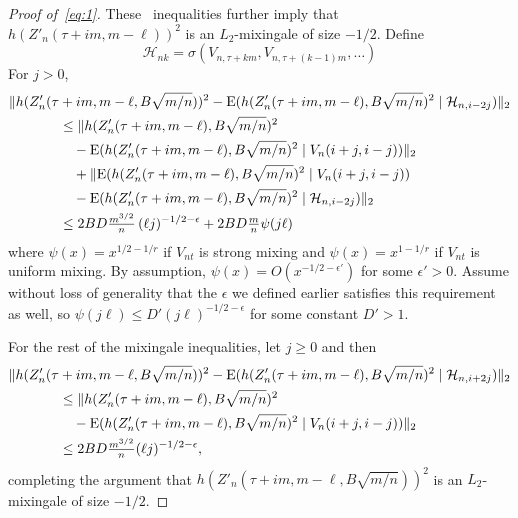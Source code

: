 \documentclass[11pt]{article}
\begin{document}
{\begin{proof}[Proof of~\eqref{eq:1}]
  These \ned\ inequalities further imply that $h(Z'_n(\tau + im, m -
  \ell))^2$ is an $L_2$-mixingale of size $-1/2$. Define
  \begin{equation*}
     \mathcal{H}_{nk} = \sigma(V_{n,\tau + km}, V_{n,\tau + (k-1)m},\dots)
  \end{equation*}
  For $j > 0$,
  \begin{align*}
    \lVert h(Z'_n(\tau &+ im, m - \ell, B \sqrt{m/n}))^2 -
    \operatorname{E}(h(Z'_n(\tau + im, m - \ell), B \sqrt{m/n})^2 \mid
    \mathcal{H}_{n,i - 2j}) \rVert_2 \\
    &\leq 
    \lVert h(Z'_n(\tau + im, m - \ell), B \sqrt{m/n})^2 \\
    &\quad -
    \operatorname{E}(h(Z'_n(\tau + im, m - \ell), B \sqrt{m/n})^2 \mid V_n(i + j, i-j)) \rVert_2 \\
    & \quad
    + \lVert \operatorname{E}(h(Z'_n(\tau + im, m - \ell), B \sqrt{m/n})^2 \mid V_n(i+ j, i-j))\\
    & \quad-
    \operatorname{E}(h(Z'_n(\tau + im, m - \ell), B \sqrt{m/n})^2 \mid \mathcal{H}_{n,i - 2j}) \lVert_2 \\
    &\leq 2 B D \tfrac{m^{3/2}}{n} \, (\ell j)^{-1/2 - \epsilon}
    + 2 B D \tfrac{m}{n} \psi(j \ell)
  \end{align*}
  where $\psi(x) = x^{1/2 - 1/r}$ if $V_{nt}$ is strong mixing and
  $\psi(x) = x^{1 - 1/r}$ if $V_{nt}$ is uniform mixing. By
  assumption, $\psi(x) = O(x^{-1/2 - \epsilon'})$ for some $\epsilon'
  > 0$. Assume without loss of generality that the
  $\epsilon$ we defined earlier satisfies this requirement as well,
  so $\psi(j \ell) \leq D' (j \ell)^{-1/2 - \epsilon}$ for some constant
  $D' > 1$.

  For the rest of the mixingale inequalities, let $j \geq 0$ and then
  \begin{align*}
    \lVert h(Z'_n(\tau &+ im, m - \ell, B \sqrt{m/n}))^2 -
    \operatorname{E}(h(Z'_n(\tau + im, m - \ell), B \sqrt{m/n})^2 \mid
    \mathcal{H}_{n,i + 2j}) \rVert_2 \\
    & \leq \lVert h(Z'_n(\tau + im, m - \ell), B \sqrt{m/n})^2 \\
    & \quad - \operatorname{E}(h(Z'_n(\tau + im, m - \ell), B \sqrt{m/n})^2 \mid
    V_n(i + j, i-j)) \rVert_2 \\
    & \leq 2 B D \tfrac{m^{3/2}}{n} (\ell j)^{-1/2 - \epsilon},
  \end{align*}
  completing the argument that $h(Z'_n(\tau + im, m - \ell, B
  \sqrt{m/n}))^2$ is an $L_2$-mixingale of size $-1/2$.


\end{proof}}
\end{document}

